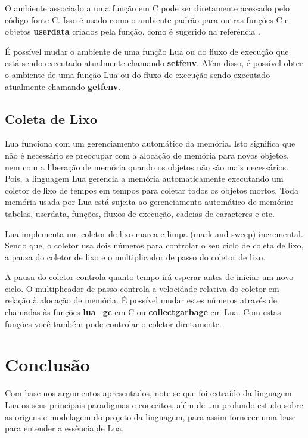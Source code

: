 \documentclass[
12pt, %
openright, %
oneside, %
a4paper, %
english, %
brazil, %
]{abntex2}
\begin{document}
O ambiente associado a uma função em C pode ser diretamente acessado pelo código fonte C. Isso é usado como o ambiente padrão para outras funções C e objetos \textbf{userdata} criados pela função, como é sugerido na referência \cite{Introduction}.

É possível mudar o ambiente de uma função Lua ou do fluxo de execução que está sendo executado atualmente chamando \textbf{setfenv}. Além disso, é possível obter o ambiente de uma função Lua ou do fluxo de execução sendo executado atualmente chamando \textbf{getfenv}.

\section{Coleta de Lixo}
Lua funciona com um gerenciamento automático da memória. Isto significa que não é necessário se preocupar com a alocação de memória para novos objetos, nem com a liberação de memória quando os objetos não são mais necessários. Pois, a linguagem Lua gerencia a memória automaticamente executando um coletor de lixo de tempos em tempos para coletar todos os objetos mortos. Toda memória usada por Lua está sujeita ao gerenciamento automático de memória: tabelas, userdata, funções, fluxos de execução, cadeias de caracteres e etc.

Lua implementa um coletor de lixo marca-e-limpa (mark-and-sweep) incremental. Sendo que, o coletor usa dois números para controlar o seu ciclo de coleta de lixo, a pausa do coletor de lixo e o multiplicador de passo do coletor de lixo.

A pausa do coletor controla quanto tempo irá esperar antes de iniciar um novo ciclo. O multiplicador de passo controla a velocidade relativa do coletor em relação à alocação de memória. É possível mudar estes números através de chamadas às funções \textbf{lua\_gc} em C ou \textbf{collectgarbage} em Lua. Com estas funções você também pode controlar o coletor diretamente.



\chapter{Conclusão}

Com base nos argumentos apresentados, note-se que foi extraído da linguagem Lua os seus principais paradigmas e conceitos, além de um profundo estudo sobre as origens e modelagem do projeto da linguagem, para assim fornecer uma base para entender a essência de Lua.
\end{document}
